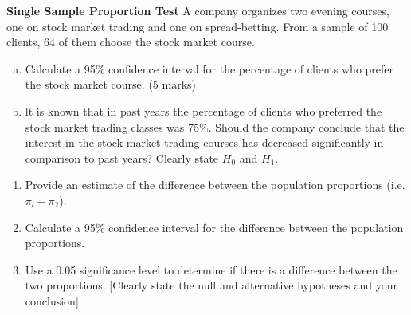\documentclass[]{report}
\begin{document}
	
	\item 	\textbf{Single Sample Proportion Test } %
	A company organizes two evening courses, one on stock market trading and one on
	spread-betting. From a sample of 100 clients, 64 of them choose the stock market course.
	
	\begin{enumerate}[(a)]
		\item Calculate a 95\% confidence interval for the percentage of clients who
		prefer the stock market course. (5 marks)
		\item lt is known that in past years the percentage of clients who preferred the
		stock market trading classes was 75\%. Should the company conclude that
		the interest in the stock market trading courses has decreased significantly in
		comparison to past years? Clearly state $H_0$ and $H_1$.
	\end{enumerate}
	\newpage 
	\begin{enumerate}
		\item Provide an estimate of the difference between the population
		proportions (i.e. $\pi_l -\pi_2$).
		\item Calculate a 95\% confidence interval for the difference between the
		population proportions.
		\item Use a 0.05 significance level to determine if there is a difference
		between the two proportions. [Clearly state the null and alternative hypotheses
		and your conclusion].
	\end{enumerate}
	
	
\end{document}
